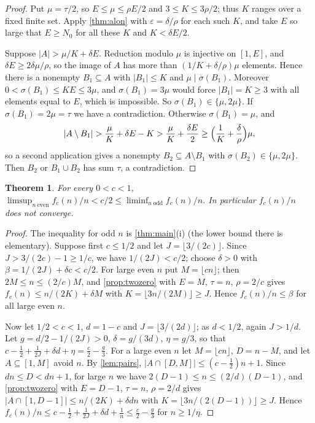 \documentclass[11pt,reqno]{amsart}
\numberwithin{equation}{section}
\newtheorem{theorem}{Theorem}[section]
\theoremstyle{definition}
\theoremstyle{remark}
\newcommand{\eps}{\varepsilon}
\newcommand{\card}[1]{\lvert #1\rvert}
\newcommand{\floor}[1]{\lfloor #1\rfloor}
\begin{document}
\begin{proof}
Put $\mu=\tau/2$, so $E\le\mu\le\rho E/2$ and $3\le K\le3\rho/2$; thus $K$ ranges over a fixed finite set. Apply \cref{thm:alon} with $\eps=\delta/\rho$ for each such $K$, and take $E$ so large that $E\ge N_0$ for all these $K$ and $K<\delta E/2$.

Suppose $\card A>\mu/K+\delta E$. Reduction modulo $\mu$ is injective on $[1,E]$, and $\delta E\ge2\delta\mu/\rho$, so the image of $A$ has more than $(1/K+\delta/\rho)\mu$ elements. Hence there is a nonempty $B_1\subseteq A$ with $\card{B_1}\le K$ and $\mu\mid\sigma(B_1)$. Moreover $0<\sigma(B_1)\le KE\le3\mu$, and $\sigma(B_1)=3\mu$ would force $\card{B_1}=K\ge3$ with all elements equal to $E$, which is impossible. So $\sigma(B_1)\in\{\mu,2\mu\}$. If $\sigma(B_1)=2\mu=\tau$ we have a contradiction. Otherwise $\sigma(B_1)=\mu$, and
\[
 \card{A\setminus B_1}>\frac\mu K+\delta E-K>\frac\mu K+\frac{\delta E}2\ge\Bigl(\frac1K+\frac\delta\rho\Bigr)\mu ,
\]
so a second application gives a nonempty $B_2\subseteq A\setminus B_1$ with $\sigma(B_2)\in\{\mu,2\mu\}$. Then $B_2$ or $B_1\cup B_2$ has sum $\tau$, a contradiction.
\end{proof}

\begin{theorem}\label{thm:zerosum-irregular}
For every $0<c<1$, $\limsup_{n\ \mathrm{even}}f_c(n)/n<c/2\le\liminf_{n\ \mathrm{odd}}f_c(n)/n$. In particular $f_c(n)/n$ does not converge.
\end{theorem}

\begin{proof}
The inequality for odd $n$ is \cref{thm:main}(i) (the lower bound there is elementary). Suppose first $c\le1/2$ and let $J=\floor{3/(2c)}$. Since $J>3/(2c)-1\ge1/c$, we have $1/(2J)<c/2$; choose $\delta>0$ with $\beta=1/(2J)+\delta c<c/2$. For large even $n$ put $M=\floor{cn}$; then $2M\le n\le(2/c)M$, and \cref{prop:twozero} with $E=M$, $\tau=n$, $\rho=2/c$ gives $f_c(n)\le n/(2K)+\delta M$ with $K=\floor{3n/(2M)}\ge J$. Hence $f_c(n)/n\le\beta$ for all large even $n$.

Now let $1/2<c<1$, $d=1-c$ and $J=\floor{3/(2d)}$; as $d<1/2$, again $J>1/d$. Let $g=d/2-1/(2J)>0$, $\delta=g/(3d)$, $\eta=g/3$, so that $c-\frac12+\frac1{2J}+\delta d+\eta=\frac c2-\frac g3$. For a large even $n$ let $M=\floor{cn}$, $D=n-M$, and let $A\subseteq[1,M]$ avoid $n$. By \cref{lem:pairs}, $\card{A\cap[D,M]}\le(c-\frac12)n+1$. Since $dn\le D<dn+1$, for large $n$ we have $2(D-1)\le n\le(2/d)(D-1)$, and \cref{prop:twozero} with $E=D-1$, $\tau=n$, $\rho=2/d$ gives $\card{A\cap[1,D-1]}\le n/(2K)+\delta dn$ with $K=\floor{3n/(2(D-1))}\ge J$. Hence $f_c(n)/n\le c-\frac12+\frac1{2J}+\delta d+\frac1n\le\frac c2-\frac g3$ for $n\ge1/\eta$.
\end{proof}
\end{document}
